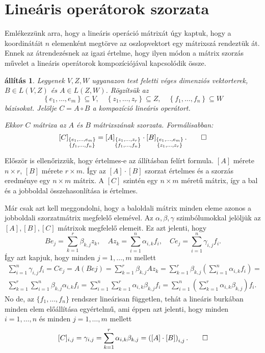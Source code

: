\documentclass[a4paper, showtrims]{memoir}
\makeatletter
\renewenvironment{proof}[1][\proofname]
    {\par\pushQED{\qed}%
    \normalfont \topsep6\p@\@plus6\p@\relax
    \trivlist
    \item[\hskip\labelsep
        \itshape
    #1\@addpunct{:}]\ignorespaces}
    {\popQED\endtrivlist\@endpefalse}
\theoremstyle{plain}
\newtheorem{proposition}{állítás}[chapter]
\theoremstyle{remark}
\theoremstyle{definition}
\makeatother
\begin{document}
\section{Lineáris operátorok szorzata}
Emlékezzünk arra, hogy a lineáris operáció mátrixát úgy kaptuk, hogy a koordinátáit $n$ elemenként
megtörve az oszlopvektort egy mátrixszá rendeztük át.
Ennek az átrendezésnek az igazi értelme, hogy ilyen módon a mátrix szorzás művelet a lineáris operátorok kompozíciójával
kapcsolódik össze.
\begin{proposition}
	Legyenek $V,Z,W$ ugyanazon test feletti véges dimenziós vektorterek,
	$B \in L\left( V,Z \right)$ és $A \in L\left( Z,W \right)$.
	Rögzítsük az
	\[
		\left\{ e_1,\ldots,e_m \right\}\subseteq V,\quad
		\left\{ z_1,\ldots,z_r \right\}\subseteq Z,\quad
		\left\{ f_1,\ldots,f_n \right\}\subseteq W
	\]
	bázisokat.
	Jelölje $C=A\circ B$ a kompozíció lineáris operátort.

	Ekkor $C$ mátrixa az $A$ és $B$ mátrixszának szorzata.
	Formálisabban:
	\[
		\left[ C \right]_{\substack{\left\{ e_1,\ldots,e_m \right\}\\ \left\{ f_1,\ldots,f_n \right\}}}
		=
		\left[ A \right]_{\substack{\left\{ z_1,\ldots,z_r \right\}\\ \left\{ f_1,\ldots,f_n \right\}}}
		\cdot
		\left[ B \right]_{\substack{\left\{ e_1,\ldots,e_m \right\}\\ \left\{ z_1,\ldots,z_r \right\}}}.\qedhere
	\]
\end{proposition}
\begin{proof}
	Először is ellenőrizzük, hogy értelmes-e az állításban felírt formula.
	$\left[ A \right]$ mérete $n\times r$, $\left[ B \right]$ mérete $r\times m$.
	Így az $[A]\cdot[B]$ szorzat értelmes és a szorzás eredménye egy $n\times m$ mátrix.
	A $[C]$ szintén egy $n\times m$ méretű mátrix,
	így a bal és a jobboldal összehasonlítása is értelmes.

	Már csak azt kell meggondolni,
	hogy a baloldali mátrix minden eleme azonos a jobboldali szorzatmátrix megfelelő elemével.
	Az $\alpha,\beta,\gamma$ szimbólumokkal jelöljük az $[A],[B], [C]$ mátrixok megfelelő elemeit.
	Ez azt jelenti, hogy
	\[
		Be_j=\sum_{k=1}^r\beta_{k,j}z_k,\quad
		Az_k=\sum_{i=1}^n\alpha_{i,k}f_i,\quad
		Ce_j=\sum_{i=1}^n\gamma_{i,j}f_i.
	\]
	Így azt kapjuk, hogy minden $j=1,\ldots,m$ mellett
	\begin{multline*}
		\sum_{i=1}^n\gamma_{i,j}f_i
		=
		Ce_j
		=A\left( Bej \right)
		=
		\sum_{k=1}^r\beta_{k,j}Az_k
		=
		\sum_{k=1}^r\beta_{k,j}\left( \sum_{i=1}^n\alpha_{i,k}f_i \right)
		=\\
		\sum_{k=1}^r\sum_{i=1}^n\beta_{k,j}\alpha_{i,k}f_i
		=
		\sum_{i=1}^n\sum_{k=1}^r\alpha_{i,k}\beta_{k,j}f_i
		=
		\sum_{i=1}^n\left( \sum_{k=1}^r\alpha_{i,k}\beta_{k,j} \right)f_i.
	\end{multline*}
	No de, az $\{f_1,\ldots,f_n\}$ rendszer lineárisan független,
	tehát a lineáris burkában minden elem előállítása egyértelmű,
	ami éppen azt jelenti, hogy minden $i=1,\ldots,n$ és minden $j=1,\ldots,m$ mellett
	\[
		[C]_{i,j}=\gamma_{i,j}
		=\sum_{k=1}^r\alpha_{i,k}\beta_{k,j}
		=\left( \left[ A \right]\cdot\left[ B \right] \right)_{i,j}.\qedhere
	\]
\end{proof}
\end{document}
